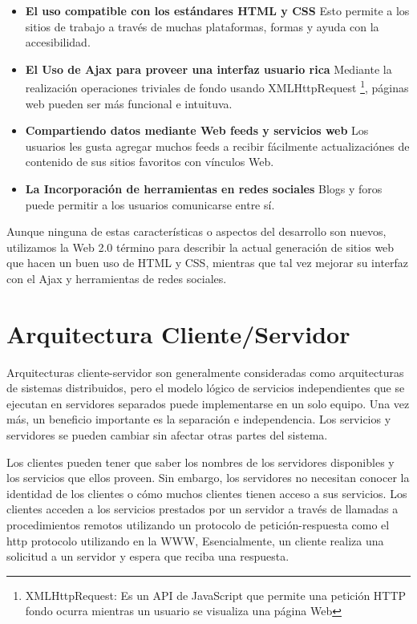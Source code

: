 \begin{itemize}

\item \textbf{El uso compatible con los est\'{a}ndares HTML y CSS} Esto permite a
 los sitios de trabajo a trav\'{e}s de muchas plataformas, formas y ayuda con la
 accesibilidad.
\item \textbf{El Uso de Ajax para proveer una interfaz usuario rica} Mediante la
realizaci\'{o}n operaciones triviales de fondo usando XMLHttpRequest \footnote{XMLHttpRequest:
Es un API de JavaScript que permite una petici\'{o}n HTTP fondo ocurra mientras
un usuario se visualiza una p\'{a}gina Web}, p\'{a}ginas web pueden ser m\'{a}s
funcional e intuituva.
\item \textbf{Compartiendo datos mediante Web feeds y servicios web} Los
usuarios les gusta agregar muchos feeds a recibir f\'{a}cilmente actualizaci\'{o}nes
de contenido de sus sitios favoritos con v\'{i}nculos Web.
\item \textbf{La Incorporaci\'{o}n de herramientas en redes sociales} Blogs y foros 
puede permitir a los usuarios comunicarse entre s\'{i}.
	
\end{itemize}

Aunque ninguna de estas caracter\'{i}sticas o aspectos del desarrollo son nuevos,
utilizamos la Web 2.0 t\'{e}rmino para describir la actual generaci\'{o}n de sitios
web que hacen un buen uso de HTML y CSS, mientras que tal vez mejorar su interfaz
con el Ajax y herramientas de redes sociales.\cite{zervaas2007practical}

\section{Arquitectura Cliente/Servidor}

Arquitecturas cliente-servidor son generalmente consideradas como arquitecturas
de sistemas distribuidos, pero el modelo l\'{o}gico de servicios independientes
que se ejecutan en servidores separados puede implementarse en un solo equipo.
Una vez m\'{a}s, un beneficio importante es la separaci\'{o}n e independencia.
Los servicios y servidores se pueden cambiar sin afectar otras partes del sistema.

Los clientes pueden tener que saber los nombres de los servidores disponibles y
los servicios que ellos proveen. Sin embargo, los servidores no necesitan conocer
la identidad de los clientes o c\'{o}mo muchos clientes tienen acceso a sus
servicios. Los clientes acceden a los servicios prestados por un servidor a 
trav\'{e}s de llamadas a procedimientos remotos utilizando un protocolo de 
petici\'{o}n-respuesta como el http protocolo utilizando en la WWW, Esencialmente,
un cliente realiza una solicitud a un servidor y espera que reciba una respuesta.

